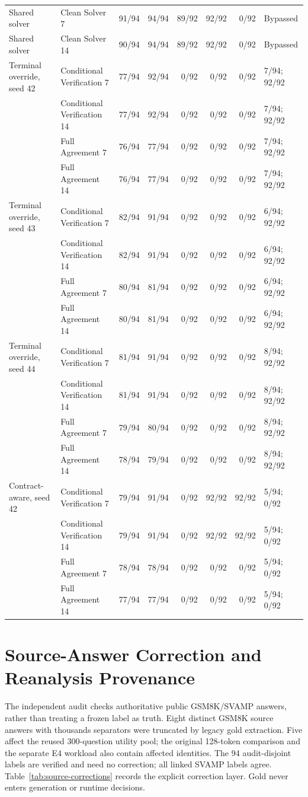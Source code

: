 \documentclass[journal,onecolumn]{IEEEtran}
\begin{document}
\begin{longtable}{@{}llrrrrrl@{}}
Shared solver & Clean Solver 7 & 91/94 & 94/94 & 89/92 & 92/92 & 0/92 & Bypassed\\
Shared solver & Clean Solver 14 & 90/94 & 94/94 & 89/92 & 92/92 & 0/92 & Bypassed\\
Terminal override, seed 42 & Conditional Verification 7 & 77/94 & 92/94 & 0/92 & 0/92 & 0/92 & 7/94; 92/92\\
 & Conditional Verification 14 & 77/94 & 92/94 & 0/92 & 0/92 & 0/92 & 7/94; 92/92\\
 & Full Agreement 7 & 76/94 & 77/94 & 0/92 & 0/92 & 0/92 & 7/94; 92/92\\
 & Full Agreement 14 & 76/94 & 77/94 & 0/92 & 0/92 & 0/92 & 7/94; 92/92\\
Terminal override, seed 43 & Conditional Verification 7 & 82/94 & 91/94 & 0/92 & 0/92 & 0/92 & 6/94; 92/92\\
 & Conditional Verification 14 & 82/94 & 91/94 & 0/92 & 0/92 & 0/92 & 6/94; 92/92\\
 & Full Agreement 7 & 80/94 & 81/94 & 0/92 & 0/92 & 0/92 & 6/94; 92/92\\
 & Full Agreement 14 & 80/94 & 81/94 & 0/92 & 0/92 & 0/92 & 6/94; 92/92\\
Terminal override, seed 44 & Conditional Verification 7 & 81/94 & 91/94 & 0/92 & 0/92 & 0/92 & 8/94; 92/92\\
 & Conditional Verification 14 & 81/94 & 91/94 & 0/92 & 0/92 & 0/92 & 8/94; 92/92\\
 & Full Agreement 7 & 79/94 & 80/94 & 0/92 & 0/92 & 0/92 & 8/94; 92/92\\
 & Full Agreement 14 & 78/94 & 79/94 & 0/92 & 0/92 & 0/92 & 8/94; 92/92\\
Contract-aware, seed 42 & Conditional Verification 7 & 79/94 & 91/94 & 0/92 & 92/92 & 92/92 & 5/94; 0/92\\
 & Conditional Verification 14 & 79/94 & 91/94 & 0/92 & 92/92 & 92/92 & 5/94; 0/92\\
 & Full Agreement 7 & 78/94 & 78/94 & 0/92 & 0/92 & 0/92 & 5/94; 0/92\\
 & Full Agreement 14 & 77/94 & 77/94 & 0/92 & 0/92 & 0/92 & 5/94; 0/92\\
\end{longtable}
\normalsize


\section{Source-Answer Correction and Reanalysis Provenance}
\label{sec:s14}
The independent audit checks authoritative public GSM8K/SVAMP answers, rather than treating a frozen label as truth. Eight distinct GSM8K source answers with thousands separators were truncated by legacy gold extraction. Five affect the reused 300-question utility pool; the original 128-token comparison and the separate E4 workload also contain affected identities. The 94 audit-disjoint labels are verified and need no correction; all linked SVAMP labels agree. Table~\ref{tab:source-corrections} records the explicit correction layer. Gold never enters generation or runtime decisions.
\end{document}
